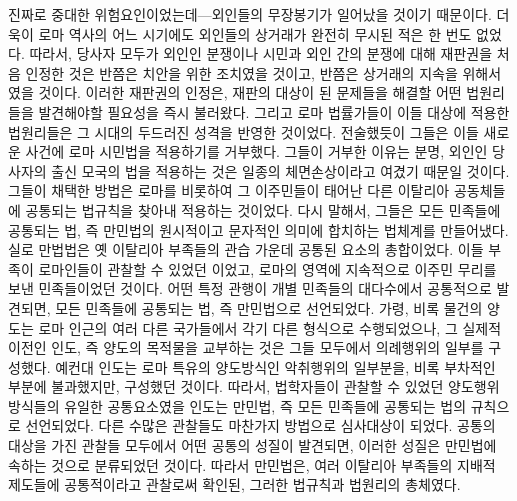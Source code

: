 진짜로 중대한 위험요인이었는데---외인들의 무장봉기가 일어났을 것이기 때문이다.
더욱이 로마 역사의 어느 시기에도 외인들의 상거래가 완전히 무시된 적은
한 번도 없었다.
따라서,
당사자 모두가 외인인 분쟁이나 시민과 외인 간의 분쟁에 대해
재판권을 처음 인정한 것은
반쯤은 치안을 위한 조치였을 것이고, 반쯤은 상거래의 지속을 위해서였을 것이다.
이러한 재판권의 인정은, 재판의 대상이 된 문제들을 해결할 어떤 법원리들을
발견해야할 필요성을 즉시 불러왔다. 그리고
로마 법률가들이 이들 대상에 적용한 법원리들은 그 시대의
두드러진 성격을 반영한 것이었다.
전술했듯이 그들은 이들 새로운 사건에 로마 시민법을 적용하기를 거부했다.
그들이 거부한 이유는 분명, 외인인 당사자의 출신 모국의 법을 적용하는 것은
일종의 체면손상이라고 여겼기 때문일 것이다.
그들이 채택한 방법은 로마를 비롯하여
그 이주민들이 태어난 다른 이탈리아 공동체들에
공통되는 법규칙을 찾아내 적용하는 것이었다.
다시 말해서, 그들은
모든 민족들에 공통되는 법, 즉 만민법의 원시적이고
문자적인 의미에 합치하는 법체계를 만들어냈다.
실로 만법법은 옛 이탈리아 부족들의 관습 가운데 공통된 요소의 총합이었다.
이들 부족이 로마인들이 관찰할 수 있었던 이었고,
로마의 영역에 지속적으로 이주민 무리를 보낸 민족들이었던 것이다.
어떤 특정 관행이 개별 민족들의 대다수에서 공통적으로 발견되면,
모든 민족들에 공통되는 법, 즉 만민법으로 선언되었다.
가령,
비록 물건의 양도는 로마 인근의 여러 다른 국가들에서 각기 다른 형식으로
수행되었으나, 그 실제적 이전인 인도, 즉
양도의 목적물을 교부하는 것은 그들 모두에서 의례행위의 일부를 구성했다.
예컨대 인도는 로마 특유의 양도방식인
악취행위의 일부분을, 비록
부차적인 부분에 불과했지만, 구성했던 것이다.
따라서,
법학자들이 관찰할 수 있었던 양도행위 방식들의 유일한
공통요소였을 인도는
만민법, 즉 모든 민족들에 공통되는 법의 규칙으로 선언되었다.
다른 수많은 관찰들도 마찬가지 방법으로 심사대상이 되었다.
공통의 대상을 가진 관찰들 모두에서
어떤 공통의 성질이 발견되면,
이러한 성질은 만민법에 속하는 것으로 분류되었던 것이다.
따라서 만민법은,
여러 이탈리아 부족들의 지배적 제도들에 공통적이라고
관찰로써 확인된,
그러한 법규칙과 법원리의 총체였다.

